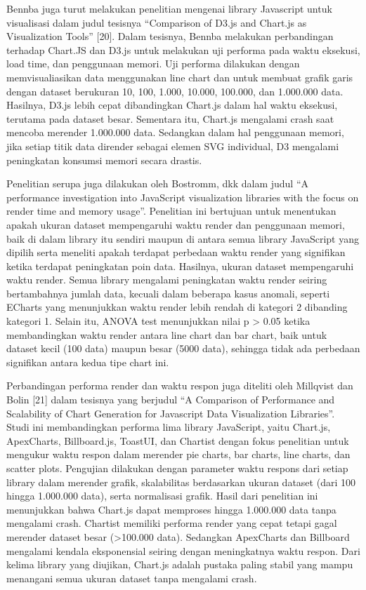 Bennba juga turut melakukan penelitian mengenai library Javascript untuk visualisasi dalam judul tesisnya “Comparison of D3.js and Chart.js as Visualization Tools” [20]. Dalam tesisnya, Bennba melakukan perbandingan terhadap Chart.JS dan D3.js untuk melakukan uji performa pada waktu eksekusi, load time, dan penggunaan memori. Uji performa dilakukan dengan memvisualiasikan data menggunakan line chart dan untuk membuat grafik garis dengan dataset berukuran 10, 100, 1.000, 10.000, 100.000, dan 1.000.000 data. Hasilnya, D3.js lebih cepat dibandingkan Chart.js dalam hal waktu eksekusi, terutama pada dataset besar. Sementara itu, Chart.js mengalami crash saat mencoba merender 1.000.000 data. Sedangkan dalam hal penggunaan memori, jika setiap titik data dirender sebagai elemen SVG individual, D3 mengalami  peningkatan konsumsi memori secara drastis.

Penelitian serupa juga dilakukan oleh Bostromm, dkk \cite{Bostrm2022} dalam judul “A performance investigation into JavaScript visualization libraries with the focus on render time and memory usage”. Penelitian ini bertujuan untuk menentukan apakah ukuran dataset mempengaruhi waktu render dan penggunaan memori, baik di dalam library itu sendiri maupun di antara semua library JavaScript yang dipilih serta meneliti apakah terdapat perbedaan waktu render yang signifikan ketika terdapat peningkatan poin data. Hasilnya, ukuran dataset mempengaruhi waktu render. Semua library mengalami peningkatan waktu render seiring bertambahnya jumlah data, kecuali dalam beberapa kasus anomali, seperti ECharts yang menunjukkan waktu render lebih rendah di kategori 2 dibanding kategori 1. Selain itu, ANOVA test menunjukkan nilai p > 0.05 ketika membandingkan waktu render antara line chart dan bar chart, baik untuk dataset kecil (100 data) maupun besar (5000 data), sehingga tidak ada perbedaan signifikan antara kedua tipe chart ini. 

Perbandingan performa render dan waktu respon juga diteliti oleh Millqvist dan Bolin [21] dalam tesisnya yang berjudul “A Comparison of Performance and Scalability of Chart Generation for Javascript Data Visualization Libraries”. Studi ini membandingkan performa lima library JavaScript, yaitu Chart.js, ApexCharts, Billboard.js, ToastUI, dan Chartist dengan fokus penelitian untuk mengukur waktu respon dalam merender pie charts, bar charts, line charts, dan scatter plots. Pengujian dilakukan dengan parameter waktu respons dari setiap library dalam merender grafik, skalabilitas berdasarkan ukuran dataset (dari 100 hingga 1.000.000 data), serta normalisasi grafik. Hasil dari penelitian ini menunjukkan bahwa Chart.js dapat memproses hingga 1.000.000 data tanpa mengalami crash. Chartist memiliki performa render yang cepat tetapi gagal merender dataset besar (>100.000 data). Sedangkan ApexCharts dan Billboard mengalami kendala eksponensial seiring dengan meningkatnya waktu respon. Dari kelima library yang diujikan, Chart.js adalah pustaka paling stabil yang mampu menangani semua ukuran dataset tanpa mengalami crash. 

